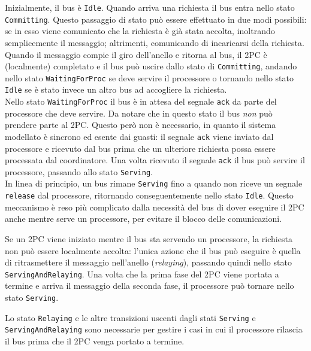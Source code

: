 Inizialmente, il bus è \texttt{Idle}. Quando arriva una richiesta il bus entra nello stato \texttt{Committing}. Questo passaggio di stato può essere effettuato in due modi possibili: se in esso viene comunicato che la richiesta è già stata accolta, inoltrando semplicemente il messaggio; altrimenti, comunicando di incaricarsi della richiesta. Quando il messaggio compie il giro dell'anello e ritorna al bus, il 2PC è (localmente) completato e il bus può uscire dallo stato di \texttt{Committing}, andando nello stato \texttt{WaitingForProc} se deve servire il processore o tornando nello stato \texttt{Idle} se è stato invece un altro bus ad accogliere la richiesta.\\


Nello stato \texttt{WaitingForProc} il bus è in attesa del segnale \texttt{ack} da parte del processore che deve servire. Da notare che in questo stato il bus \textit{non} può prendere parte al 2PC. Questo però non è necessario, in quanto il sistema modellato è sincrono ed esente dai guasti: il segnale \texttt{ack} viene inviato dal processore e ricevuto dal bus prima che un ulteriore richiesta possa essere processata dal coordinatore. Una volta ricevuto il segnale \texttt{ack} il bus può servire il processore, passando allo stato \texttt{Serving}.\\


In linea di principio, un bus rimane \texttt{Serving} fino a quando non riceve un segnale \texttt{release} dal processore, ritornando conseguentemente nello stato \texttt{Idle}. Questo meccanismo è reso più complicato dalla necessità del bus di dover eseguire il 2PC anche mentre serve un processore, per evitare il blocco delle comunicazioni.

Se un 2PC viene iniziato mentre il bus sta servendo un processore, la richiesta non può essere localmente accolta: l'unica azione che il bus può eseguire è quella di ritrasmettere il messaggio nell'anello (\textit{relaying}), passando quindi nello stato \texttt{ServingAndRelaying}. Una volta che la prima fase del 2PC viene portata a termine e arriva il messaggio della seconda fase, il processore può tornare nello stato \texttt{Serving}.

Lo stato \texttt{Relaying} e le altre transizioni uscenti dagli stati \texttt{Serving} e \texttt{\justify ServingAndRelaying} sono necessarie per gestire i casi in cui il processore rilascia il bus prima che il 2PC venga portato a termine.
